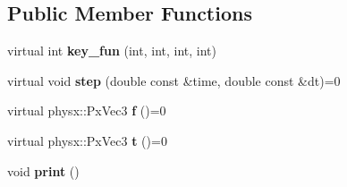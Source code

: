 \subsection*{\-Public \-Member \-Functions}
\begin{DoxyCompactItemize}
\item 
\hypertarget{classNeb_1_1Actor_1_1Control_1_1RigidBody_1_1Base_aebd8b92d6ca5a4c8c3da4f421c7695bc}{virtual int {\bfseries key\-\_\-fun} (int, int, int, int)}\label{classNeb_1_1Actor_1_1Control_1_1RigidBody_1_1Base_aebd8b92d6ca5a4c8c3da4f421c7695bc}

\item 
\hypertarget{classNeb_1_1Actor_1_1Control_1_1RigidBody_1_1Base_a29fef10b2c81d6739127440fe3b69a0d}{virtual void {\bfseries step} (double const \&time, double const \&dt)=0}\label{classNeb_1_1Actor_1_1Control_1_1RigidBody_1_1Base_a29fef10b2c81d6739127440fe3b69a0d}

\item 
\hypertarget{classNeb_1_1Actor_1_1Control_1_1RigidBody_1_1Base_aa1ce29a382717b1fb33b5010f9d26859}{virtual physx\-::\-Px\-Vec3 {\bfseries f} ()=0}\label{classNeb_1_1Actor_1_1Control_1_1RigidBody_1_1Base_aa1ce29a382717b1fb33b5010f9d26859}

\item 
\hypertarget{classNeb_1_1Actor_1_1Control_1_1RigidBody_1_1Base_abd9a7c8df4b02845027d970c94b70fdd}{virtual physx\-::\-Px\-Vec3 {\bfseries t} ()=0}\label{classNeb_1_1Actor_1_1Control_1_1RigidBody_1_1Base_abd9a7c8df4b02845027d970c94b70fdd}

\item 
\hypertarget{classNeb_1_1Actor_1_1Control_1_1RigidBody_1_1Base_a5a855eb91534056349e7a5c260bdbe5c}{void {\bfseries print} ()}\label{classNeb_1_1Actor_1_1Control_1_1RigidBody_1_1Base_a5a855eb91534056349e7a5c260bdbe5c}

\end{DoxyCompactItemize}
